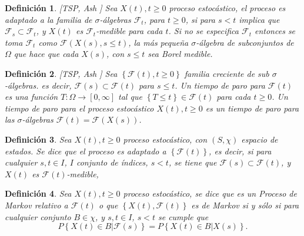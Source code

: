 \documentclass{article}
\newtheorem{Def}{Definición}[section]
\numberwithin{equation}{section}
\begin{document}
\begin{Def}\label{Def.Proc.Adaptado}[TSP, Ash \cite{RBA}]%
Sea $X\left(t\right),t\geq0$ proceso estoc\'astico, el proceso es adaptado a la familia de $\sigma$-\'algebras $\mathcal{F}_{t}$, para $t\geq0$, si para $s<t$ implica que $\mathcal{F}_{s}\subset\mathcal{F}_{t}$, y $X\left(t\right)$ es $\mathcal{F}_{t}$-medible para cada $t$. Si no se especifica $\mathcal{F}_{t}$ entonces se toma $\mathcal{F}_{t}$ como $\mathcal{F}\left(X\left(s\right),s\leq t\right)$, la m\'as peque\~na $\sigma$-\'algebra de subconjuntos de $\Omega$ que hace que cada $X\left(s\right)$, con $s\leq t$ sea Borel medible.
\end{Def}


\begin{Def}\label{Def.Tiempo.Paro}[TSP, Ash \cite{RBA}]
Sea $\left\{\mathcal{F}\left(t\right),t\geq0\right\}$ familia creciente de sub $\sigma$-\'algebras. es decir, $\mathcal{F}\left(s\right)\subset\mathcal{F}\left(t\right)$ para $s\leq t$. Un tiempo de paro para $\mathcal{F}\left(t\right)$ es una funci\'on $T:\Omega\rightarrow\left[0,\infty\right]$ tal que $\left\{T\leq t\right\}\in\mathcal{F}\left(t\right)$ para cada $t\geq0$. Un tiempo de paro para el proceso estoc\'astico $X\left(t\right),t\geq0$ es un tiempo de paro para las $\sigma$-\'algebras $\mathcal{F}\left(t\right)=\mathcal{F}\left(X\left(s\right)\right)$.
\end{Def}

\begin{Def}
Sea $X\left(t\right),t\geq0$ proceso estoc\'astico, con $\left(S,\chi\right)$ espacio de estados. Se dice que el proceso es adaptado a $\left\{\mathcal{F}\left(t\right)\right\}$, es decir, si para cualquier $s,t\in I$, $I$ conjunto de \'indices, $s<t$, se tiene que $\mathcal{F}\left(s\right)\subset\mathcal{F}\left(t\right)$, y $X\left(t\right)$ es $\mathcal{F}\left(t\right)$-medible,
\end{Def}

\begin{Def}
Sea $X\left(t\right),t\geq0$ proceso estoc\'astico, se dice que es un Proceso de Markov relativo a $\mathcal{F}\left(t\right)$ o que $\left\{X\left(t\right),\mathcal{F}\left(t\right)\right\}$ es de Markov si y s\'olo si para cualquier conjunto $B\in\chi$,  y $s,t\in I$, $s<t$ se cumple que
\begin{equation}\label{Prop.Markov}
P\left\{X\left(t\right)\in B|\mathcal{F}\left(s\right)\right\}=P\left\{X\left(t\right)\in B|X\left(s\right)\right\}.
\end{equation}
\end{Def}
\end{document}
